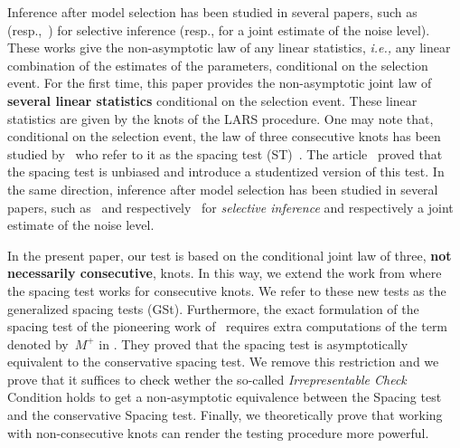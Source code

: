 \documentclass[final,numbib]{imaiai}%
\numberwithin{equation}{section}
\newcommand{\<}{\langle}
\renewcommand{\>}{\rangle}
\newcommand{\1}{\mathds{1}}
\begin{document}
Inference after model selection has been studied in several papers, such as~\cite{fithian2014optimal,taylor2015statistical} (resp.,~\cite{tian2018selective}) for selective inference (resp., for a joint estimate of the noise level). These works give the non-asymptotic law of any linear statistics, {\it i.e.,} any linear combination of the estimates of the parameters, conditional on the selection event. For the first time, this paper provides the non-asymptotic joint law of {\bf several linear statistics} conditional on the selection event. These linear statistics are given by the knots of the LARS procedure. One may note that, conditional on the selection event, the law of three {consecutive} knots has been studied by~\cite{lockhart2014significance} who refer to it as the spacing test (ST)~\citep{hastie2015statistical}. The article~\cite{azais2018power} proved that the spacing test is unbiased and introduce a studentized version of this test. In the same direction, inference after model selection has been studied in several papers, such as~\cite{fithian2014optimal,taylor2015statistical} and respectively~\cite{tian2018selective} for {\it selective inference} and respectively a joint estimate of the noise level. 

In the present paper, our test is based on the conditional joint law of three, {\bf not necessarily consecutive}, knots. In this way, we extend the work from \cite{taylor2014exact} where the spacing test works for consecutive knots. We refer to these new tests as the generalized spacing tests (GSt). Furthermore, the exact formulation of the spacing test of the pioneering work of~\cite{taylor2014exact} requires extra computations of the term denoted by~$M^+$ in \cite[Lemma 5]{taylor2014exact}. They proved that the spacing test is asymptotically equivalent to the conservative spacing test. We remove this restriction and we prove that it suffices to check wether the so-called {\it Irrepresentable Check} Condition holds to get a non-asymptotic equivalence between the Spacing test and the conservative Spacing test. Finally, we theoretically prove that working with non-consecutive knots can render the testing procedure more powerful.

\end{document}
